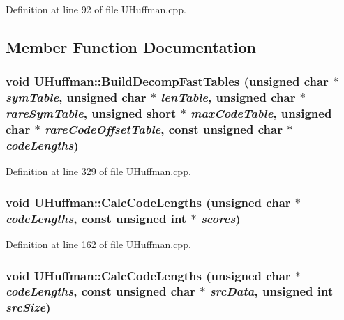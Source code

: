 Definition at line 92 of file UHuffman.cpp.

\subsection{Member Function Documentation}
\hypertarget{class_u_huffman_bd37ac1f5c41a6e288d6068ad8e6bbf4}{
\subsubsection[{BuildDecompFastTables}]{\setlength{\rightskip}{0pt plus 5cm}void UHuffman::BuildDecompFastTables (unsigned char $\ast$ {\em symTable}, \/  unsigned char $\ast$ {\em lenTable}, \/  unsigned char $\ast$ {\em rareSymTable}, \/  unsigned short $\ast$ {\em maxCodeTable}, \/  unsigned char $\ast$ {\em rareCodeOffsetTable}, \/  const unsigned char $\ast$ {\em codeLengths})}}
\label{class_u_huffman_bd37ac1f5c41a6e288d6068ad8e6bbf4}




Definition at line 329 of file UHuffman.cpp.\hypertarget{class_u_huffman_21fec644cfad4256adf8a14564945467}{
\subsubsection[{CalcCodeLengths}]{\setlength{\rightskip}{0pt plus 5cm}void UHuffman::CalcCodeLengths (unsigned char $\ast$ {\em codeLengths}, \/  const unsigned int $\ast$ {\em scores})}}
\label{class_u_huffman_21fec644cfad4256adf8a14564945467}




Definition at line 162 of file UHuffman.cpp.\hypertarget{class_u_huffman_bb7d56fc7fe5ac6c8176dcec7e33fb16}{
\subsubsection[{CalcCodeLengths}]{\setlength{\rightskip}{0pt plus 5cm}void UHuffman::CalcCodeLengths (unsigned char $\ast$ {\em codeLengths}, \/  const unsigned char $\ast$ {\em srcData}, \/  unsigned int {\em srcSize})}}
\label{class_u_huffman_bb7d56fc7fe5ac6c8176dcec7e33fb16}




